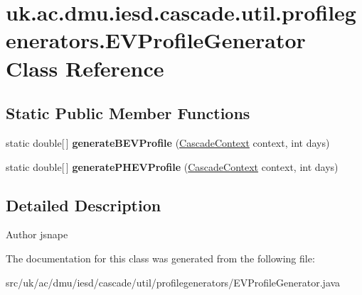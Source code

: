 \hypertarget{classuk_1_1ac_1_1dmu_1_1iesd_1_1cascade_1_1util_1_1profilegenerators_1_1_e_v_profile_generator}{\section{uk.\-ac.\-dmu.\-iesd.\-cascade.\-util.\-profilegenerators.\-E\-V\-Profile\-Generator Class Reference}
\label{classuk_1_1ac_1_1dmu_1_1iesd_1_1cascade_1_1util_1_1profilegenerators_1_1_e_v_profile_generator}
}
\subsection*{Static Public Member Functions}
\begin{DoxyCompactItemize}
\item 
\hypertarget{classuk_1_1ac_1_1dmu_1_1iesd_1_1cascade_1_1util_1_1profilegenerators_1_1_e_v_profile_generator_a8c5ab74abca6a804c053f862b9553faf}{static double\mbox{[}$\,$\mbox{]} {\bfseries generate\-B\-E\-V\-Profile} (\hyperlink{classuk_1_1ac_1_1dmu_1_1iesd_1_1cascade_1_1context_1_1_cascade_context}{Cascade\-Context} context, int days)}\label{classuk_1_1ac_1_1dmu_1_1iesd_1_1cascade_1_1util_1_1profilegenerators_1_1_e_v_profile_generator_a8c5ab74abca6a804c053f862b9553faf}

\item 
\hypertarget{classuk_1_1ac_1_1dmu_1_1iesd_1_1cascade_1_1util_1_1profilegenerators_1_1_e_v_profile_generator_adb00d18ac00efc0f08ad98eb9f7c963d}{static double\mbox{[}$\,$\mbox{]} {\bfseries generate\-P\-H\-E\-V\-Profile} (\hyperlink{classuk_1_1ac_1_1dmu_1_1iesd_1_1cascade_1_1context_1_1_cascade_context}{Cascade\-Context} context, int days)}\label{classuk_1_1ac_1_1dmu_1_1iesd_1_1cascade_1_1util_1_1profilegenerators_1_1_e_v_profile_generator_adb00d18ac00efc0f08ad98eb9f7c963d}

\end{DoxyCompactItemize}


\subsection{Detailed Description}
\begin{DoxyAuthor}{Author}
jsnape 
\end{DoxyAuthor}


The documentation for this class was generated from the following file\-:\begin{DoxyCompactItemize}
\item 
src/uk/ac/dmu/iesd/cascade/util/profilegenerators/E\-V\-Profile\-Generator.\-java\end{DoxyCompactItemize}
